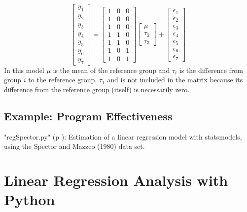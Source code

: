 \begin{equation}
  \begin{bmatrix}y_1 \\ y_2 \\ y_3 \\ y_4 \\ y_5 \\ y_6 \\ y_7 \end{bmatrix} =
  \begin{bmatrix}1 &0 &0 \\1 &0  &0 \\ 1 & 0 & 0 \\ 1 & 1 & 0 \\ 1 & 1 & 0 \\ 1 & 0 & 1 \\ 1  & 0 & 1\end{bmatrix}
  \begin{bmatrix}\mu \\  \tau_2 \\ \tau_3 \end{bmatrix}
  +
  \begin{bmatrix} \epsilon_1 \\ \epsilon_2 \\ \epsilon_3 \\ \epsilon_4 \\ \epsilon_5 \\ \epsilon_6 \\ \epsilon_7 \end{bmatrix}
\end{equation}
In this model $\mu$ is the mean of the reference group and $\tau_i$ is the difference from group $i$ to the reference group. $\tau_1$ and is not included in the matrix because its difference from the reference group (itself) is necessarily zero.
\subsection{Example: Program Effectiveness}



\PyImg "regSpector.py" (p \pageref{py:regSpector}): Estimation of a linear regression model with statsmodels, using the Spector and Mazzeo (1980) data set.

\section{Linear Regression Analysis with Python}

